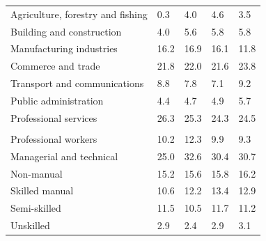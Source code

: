 \documentclass{article}
\begin{document}
\begin{table}[h]
\begin{tabular}{KTTTT}
    \hline
Agriculture, forestry and fishing  & 0.3& 4.0& 4.6& 3.5\\
Building and construction & 4.0& 5.6& 5.8& 5.8\\
Manufacturing industries & 16.2& 16.9& 16.1& 11.8\\
Commerce and trade  & 21.8& 22.0& 21.6& 23.8\\
Transport and communications  & 8.8& 7.8& 7.1& 9.2\\
Public administration & 4.4& 4.7& 4.9& 5.7\\
Professional services & 26.3& 25.3& 24.3& 24.5\\
\hline
    \\ 
    \hline
Professional workers  & 10.2& 12.3 &  9.9&  9.3\\
Managerial and technical & 25.0& 32.6& 30.4& 30.7\\
Non-manual & 15.2& 15.6& 15.8& 16.2\\
Skilled manual & 10.6& 12.2& 13.4& 12.9\\
Semi-skilled & 11.5& 10.5& 11.7& 11.2\\
Unskilled  & 2.9& 2.4& 2.9& 3.1\\
\end{tabular}
\end{table}
\pagebreak
\end{document}
